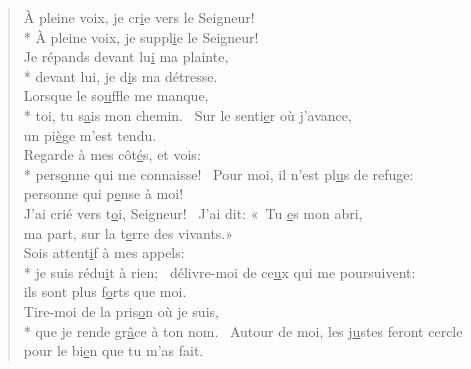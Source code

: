 
\begin{verse}
À pleine voix, je cr\underline{i}e vers le Seigneur! \\*
À pleine voix, je suppl\underline{i}e le Seigneur! \\
Je répands devant lu\underline{i} ma plainte, \\*
devant lui, je d\underline{i}s ma détresse. \\

Lorsque le so\underline{u}ffle me manque, \\*
toi, tu s\underline{a}is mon chemin.~\psalmstar
Sur le senti\underline{e}r où j’avance, \\
un pi\underline{è}ge m’est tendu. \\

Regarde à mes côt\underline{é}s, et vois: \\*
pers\underline{o}nne qui me connaisse!~\psalmstar
Pour moi, il n’est pl\underline{u}s de refuge: \\
personne qui p\underline{e}nse à moi! \\

J’ai crié vers t\underline{o}i, Seigneur!~\psalmstar
J’ai dit: « Tu \underline{e}s mon abri, \\
ma part, sur la t\underline{e}rre des vivants.» \\

Sois attent\underline{i}f à mes appels: \\*
je suis rédu\underline{i}t à rien;~\psalmstar
délivre-moi de ce\underline{u}x qui me poursuivent: \\
ils sont plus f\underline{o}rts que moi. \\

Tire-moi de la pris\underline{o}n où je suis, \\*
que je rende gr\underline{â}ce à ton nom.~\psalmstar
Autour de moi, les j\underline{u}stes feront cercle \\
pour le bi\underline{e}n que tu m’as fait. \\
\end{verse}

